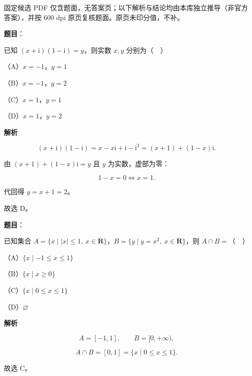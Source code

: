 
\begin{gktip}
固定候选 PDF 仅含题面，无答案页；以下解析与结论均由本库独立推导（非官方答案），并按 600 dpi 原页复核题面。原页未印分值，不补。
\end{gktip}

\begin{answer}

\textbf{题目}：

已知 $(x+\mathrm i)(1-\mathrm i)=y$，则实数 $x,y$ 分别为（　）

（A）$x=-1$，$y=1$

（B）$x=-1$，$y=2$

（C）$x=1$，$y=1$

（D）$x=1$，$y=2$

\textbf{解析}

\nopagebreak[4]
\[(x+\mathrm i)(1-\mathrm i)=x-x\mathrm i+\mathrm i-\mathrm i^2=(x+1)+(1-x)\mathrm i.\]

由 $(x+1)+(1-x)\mathrm i=y$ 且 $y$ 为实数，虚部为零：

\nopagebreak[4]
\[1-x=0\iff x=1.\]

代回得 $y=x+1=2$。

故选 D。


\end{answer}
\begin{answer}

\textbf{题目}：

已知集合 $A=\{x\mid |x|\leqslant1,\ x\in\mathbf R\}$，$B=\{y\mid y=x^2,\ x\in\mathbf R\}$，则 $A\cap B=$（　）

（A）$\{x\mid -1\leqslant x\leqslant1\}$

（B）$\{x\mid x\geqslant0\}$

（C）$\{x\mid 0\leqslant x\leqslant1\}$

（D）$\varnothing$

\textbf{解析}

\nopagebreak[4]
\[A=[-1,1],\qquad B=[0,+\infty),\]

\nopagebreak[4]
\[A\cap B=[0,1]=\{x\mid 0\leqslant x\leqslant1\}.\]

故选 C。


\end{answer}
